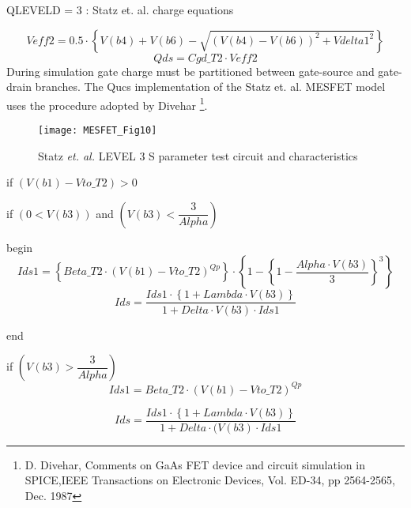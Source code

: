 QLEVELD = 3 : Statz et. al. charge equations

\begin{equation}
  Veff2 = 0.5 \cdot \left\lbrace V(b4) +V(b6) - \sqrt{(V(b4)-V(b6))^{2}+Vdelta1^{2}} \right\rbrace 
\end{equation}
\begin{equation}
  Qds = Cgd\_T2 \cdot Veff2
\end{equation}
During simulation gate charge must be partitioned between gate-source
and gate-drain branches. The Qucs implementation of the Statz
et. al. MESFET model uses the procedure adopted by Divehar
\footnote{D. Divehar, Comments on GaAs FET device and circuit
simulation in SPICE,IEEE Transactions on Electronic Devices,
Vol. ED-34, pp 2564-2565, Dec. 1987}.

\begin{figure} [here]
  \centering
  \texttt{[image: MESFET\_Fig10]}  
  \caption{Statz\textit{ et. al.} LEVEL 3 S parameter test circuit and characteristics} 
  \label{fig:fig10}
\end{figure} 

if $ (V(b1) - Vto\_T2) > 0$


\hspace{5mm} if $( 0 < V(b3) ) $  and $( V(b3) < \dfrac{3}{Alpha} )$


\hspace{10mm}    begin
		\begin{equation}
		 	Ids1 = \left\lbrace Beta\_T2 \cdot \left( V(b1)-Vto\_T2\right) ^{Qp}\right\rbrace \cdot \left\lbrace 1- \left\lbrace 1- \dfrac{Alpha \cdot V(b3)}{3}\right\rbrace ^{3}\right\rbrace 
		\end{equation}		
		\begin{equation}
 		Ids = \dfrac{ Ids1 \cdot \left\lbrace 1+Lambda \cdot V(b3) \right\rbrace}{1+Delta \cdot V(b3) \cdot Ids1} 
		\end{equation} 


\hspace{10mm}    end 

\hspace{5mm} if $( V(b3) > \dfrac{3}{Alpha} )$
		\begin{equation}
		 	Ids1 = Beta\_T2 \cdot \left( V(b1)-Vto\_T2\right) ^{Qp}
		\end{equation}

                \begin{equation}
 		Ids = \dfrac{ Ids1 \cdot \left\lbrace 1+Lambda \cdot V(b3) \right\rbrace } {1+Delta \cdot (V(b3) \cdot Ids1} 
		\end{equation} 


